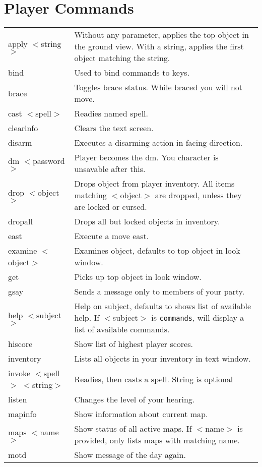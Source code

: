 \chapter{Player Commands}
\label{app:commands}
{\scriptsize
\begin{longtable}{p{4cm}p{9cm}}
apply $<$string$>$ & Without any parameter, applies the top object in the ground view. With a string, applies the first object matching the string. \\
bind & Used to bind commands to keys. \\
brace & Toggles brace status. While braced you will not move. \\
cast $<$spell$>$ & Readies named spell. \\
clearinfo & Clears the text screen. \\
disarm & Executes a disarming action in facing direction. \\
dm $<$password$>$ & Player becomes the dm. You character is unsavable after this. \\
drop $<$object$>$ & Drops object from player inventory. All items matching $<$object$>$ are dropped, unless they are locked or cursed. \\
dropall &  Drops all but locked objects in inventory. \\
east & Execute a move east. \\
examine $<$object$>$ & Examines object, defaults to top object in look window. \\
get & Picks up top object in look window. \\
gsay & Sends a message only to members of your party.\\
help $<$subject$>$ & Help on subject, defaults to shows list of available help. If $<$subject$>$ is {\tt commands}, will display a list of available commands. \\
hiscore & Show list of highest player scores. \\
inventory & Lists all objects in your inventory in text window. \\
invoke $<$spell$>$ $<$string$>$ & Readies, then casts a spell. String is optional \\
listen & Changes the level of your hearing. \\
mapinfo & Show information about current map. \\
maps $<$name$>$ & Show status of all active maps. If $<$name$>$ is provided, only lists maps with matching name. \\
motd & Show message of the day again. \\

\end{longtable}}
